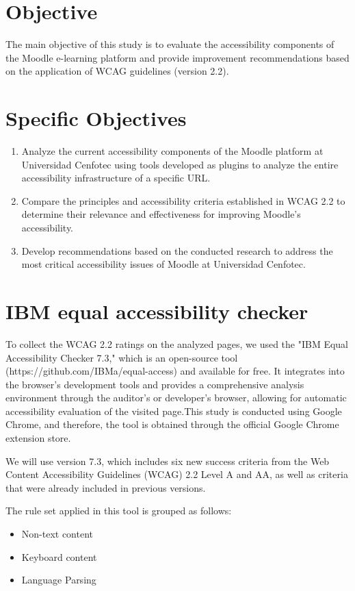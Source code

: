 \documentclass{IEEEtran}
\begin{document}
\section{Objective}
The main objective of this study is to evaluate the accessibility components of the Moodle e-learning platform and provide improvement recommendations based on the application of WCAG guidelines (version 2.2).

\section{Specific Objectives}
\begin{enumerate}
    \item Analyze the current accessibility components of the Moodle platform at Universidad Cenfotec using tools developed as plugins to analyze the entire accessibility infrastructure of a specific URL.
    \item Compare the principles and accessibility criteria established in WCAG 2.2 to determine their relevance and effectiveness for improving Moodle's accessibility.
    \item Develop recommendations based on the conducted research to address the most critical accessibility issues of Moodle at Universidad Cenfotec.
\end{enumerate}

\section{IBM equal accessibility checker}
To collect the WCAG 2.2 ratings on the analyzed pages, we used the "IBM Equal Accessibility Checker 7.3," which is an open-source tool (https://github.com/IBMa/equal-access) and available for free. It integrates into the browser's development tools and provides a comprehensive analysis environment through the auditor's or developer's browser, allowing for automatic accessibility evaluation of the visited page.This study is conducted using Google Chrome, and therefore, the tool is obtained through the official Google Chrome extension store.\cite{IBMAccessibilityEqualAccessToolkit}

We will use version 7.3, which includes six new success criteria from the Web Content Accessibility Guidelines (WCAG) 2.2 Level A and AA, as well as criteria that were already included in previous versions.

The rule set applied in this tool is grouped as follows:

\begin{itemize}
    \item Non-text content
    \item Keyboard content
    \item Language Parsing
\end{itemize}
\end{document}
